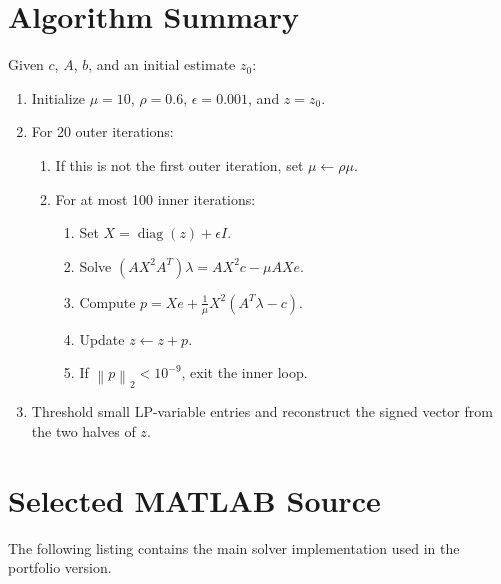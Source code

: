 \documentclass[11pt]{article}
\newcommand{\norm}[1]{\left\lVert #1 \right\rVert}
\newcommand{\diag}{\operatorname{diag}}
\begin{document}
\section{Algorithm Summary}
Given $c$, $A$, $b$, and an initial estimate $z_0$:
\begin{enumerate}[leftmargin=1.7em]
  \item Initialize $\mu=10$, $\rho=0.6$, $\epsilon=0.001$, and $z=z_0$.
  \item For 20 outer iterations:
  \begin{enumerate}[leftmargin=1.7em]
    \item If this is not the first outer iteration, set $\mu\leftarrow\rho\mu$.
    \item For at most 100 inner iterations:
    \begin{enumerate}[leftmargin=1.7em]
      \item Set $X=\diag(z)+\epsilon I$.
      \item Solve $(AX^2A^T)\lambda=AX^2c-\mu AXe$.
      \item Compute $p=Xe+\frac{1}{\mu}X^2(A^T\lambda-c)$.
      \item Update $z\leftarrow z+p$.
      \item If $\norm{p}_2<10^{-9}$, exit the inner loop.
    \end{enumerate}
  \end{enumerate}
  \item Threshold small LP-variable entries and reconstruct the signed vector from the two halves of $z$.
\end{enumerate}

\section{Selected MATLAB Source}
The following listing contains the main solver implementation used in the portfolio version.


\end{document}
